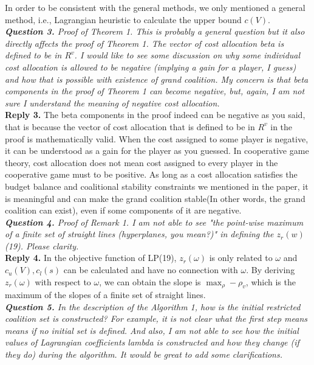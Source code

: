 \documentclass[11pt]{article}
\begin{document}
In order to be consistent with the general methods, we only mentioned a general method, i.e., Lagrangian heuristic to calculate the upper bound $c(V)$.
\\[4mm]
%
%
%
\noindent \textit{\textbf{Question 3.}
Proof of Theorem 1. This is probably a general question but it also directly affects the proof of Theorem 1. The vector of cost allocation beta is defined to be in $R^v$.
I would like to see some discussion on why some individual cost allocation is allowed to be negative (implying a gain for a player, I guess) and how that is possible with existence of grand coalition. My concern is that beta components in the proof of Theorem 1 can become negative, but, again, I am not sure I understand the meaning of negative cost allocation.}
\\[2mm]
\noindent \textbf{Reply 3.}
The beta components in the proof indeed can be negative as you said, that is because the vector of cost allocation that is defined to be in $R^v$ in the proof is mathematically valid. When the cost assigned to some player is negative, it can be understood as a gain for the player as you guessed. In cooperative game theory, cost allocation does not mean cost assigned to every player in the cooperative game must to be positive. As long as a cost allocation satisfies the budget balance and coalitional stability constraints we mentioned in the paper, it is meaningful and can make the grand coalition stable(In other words, the grand coalition can exist), even if some components of it are negative.
\\[4mm]
%
%
%
\noindent \textit{\textbf{Question 4.}
Proof of Remark 1. I am not able to see "the point-wise maximum of a finite set of straight lines (hyperplanes, you mean?)" in defining the $z_r(w)$ (19). Please clarity.}
\\[2mm]
\noindent \textbf{Reply 4.}
In the objective function of LP(19), $z_r(\omega)$ is only related to $\omega$ and $c_u(V), c_l(s)$ can be calculated and have no connection with $\omega$. By deriving $z_r(\omega)$ with respect to $\omega$, we can obtain the slope is $\max_\rho -\rho_v$, which is the maximum of the slopes of a finite set of straight lines.
\\[4mm]
%
%
%
\noindent \textit{\textbf{Question 5.}
In the description of the Algorithm 1, how is the initial restricted coalition set is constructed? For example, it is not clear what the first step means means if no initial set is defined. And also, I am not able to see how the initial values of Lagrangian coefficients lambda is constructed and how they change (if they do) during the algorithm. It would be great to add some clarifications.}
\end{document}
